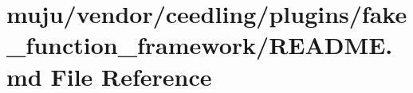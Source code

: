 \hypertarget{vendor_2ceedling_2plugins_2fake__function__framework_2_r_e_a_d_m_e_8md}{}\section{muju/vendor/ceedling/plugins/fake\+\_\+function\+\_\+framework/\+R\+E\+A\+D\+ME.md File Reference}
\label{vendor_2ceedling_2plugins_2fake__function__framework_2_r_e_a_d_m_e_8md}
